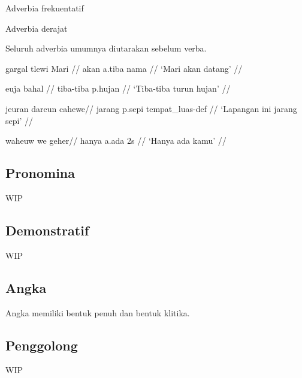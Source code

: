 \documentclass[12pt,oneside]{book}
\begin{document}
\ex Adverbia frekuentatif\par\nobreak\medskip
\quad\vbox{}\xe

\ex Adverbia derajat\par\nobreak\medskip
\quad\vbox{}\xe

Seluruh adverbia umumnya diutarakan sebelum verba.

\ex
\begingl
\gla gargal tlewi Mari //
\glb akan {\sc a}.tiba {\sc nama} // 
\glft `Mari akan datang' //
\endgl
\xe

\ex
\begingl
\gla euja bahal //
\glb tiba-tiba {\sc p}.hujan // 
\glft `Tiba-tiba turun hujan' //
\endgl
\xe

\ex
\begingl
\gla jeuran dareun cahewe//
\glb jarang {\sc p}.sepi tempat\_luas-{\sc def} // 
\glft `Lapangan ini jarang sepi' //
\endgl
\xe

\ex
\begingl
\gla waheuw we geher//
\glb hanya {\sc a}.ada {\sc 2s} // 
\glft `Hanya ada kamu' //
\endgl
\xe

\subsection{Pronomina}
WIP

\subsection{Demonstratif}
WIP

\subsection{Angka}
Angka memiliki bentuk penuh dan bentuk klitika.

\ex {}\xe

\subsection{Penggolong}
WIP
\end{document}
